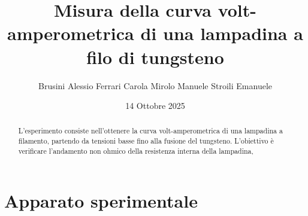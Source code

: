 \documentclass[10pt,twocolumn]{article}
\begin{document}
\justifying
	\title{\textbf{Misura della curva volt-amperometrica di una lampadina a filo di tungsteno}}
	\author{Brusini Alessio \hspace{0.7cm} Ferrari Carola \hspace{0.7cm} Mirolo Manuele \hspace{0.7cm} Stroili Emanuele}
	\date{14 Ottobre 2025}
	\maketitle
	\onecolumn
	\tableofcontents
\vspace{3cm}
	\begin{abstract}
		\centering
		\large
    L'esperimento consiste nell'ottenere la curva volt-amperometrica di una 
    lampadina a filamento, partendo da tensioni basse fino alla fusione del 
    tungsteno. L'obiettivo è verificare l'andamento non ohmico della resistenza
    interna della lampadina, 
       
	\end{abstract}

	\newpage
\restoregeometry
\twocolumn

\section{Apparato sperimentale}
\vspace{-1cm}
\end{document}

